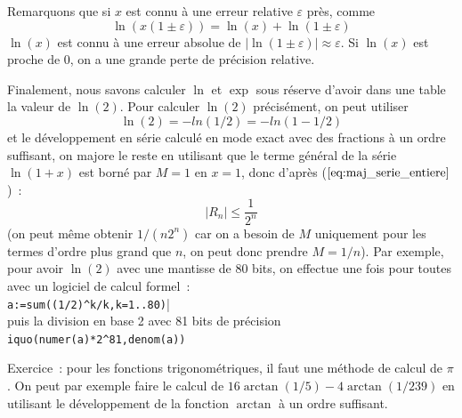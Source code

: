 \documentclass[a4paper,11pt]{article}
\begin{document}
\begin{giacjshere}
Remarquons que si $x$ est connu \`a une erreur relative $\varepsilon$
pr\`es, comme
\[ \ln(x(1 \pm \varepsilon))=\ln(x) + \ln(1 \pm \varepsilon) \]
$\ln(x)$ est connu \`a une erreur absolue de 
$|\ln(1 \pm \varepsilon)| \approx \varepsilon$. Si $\ln(x)$ est proche
de 0, on a une grande perte de pr\'ecision relative.

Finalement, nous savons calculer $\ln$ et $\exp$ sous r\'eserve
d'avoir dans une table la valeur de $\ln(2)$. Pour calculer
$\ln(2)$ pr\'ecis\'ement, on peut utiliser
\[ \ln(2)=-ln(1/2)=-ln(1-1/2) \]
et le d\'eveloppement en s\'erie calcul\'e en mode exact avec des
fractions \`a un ordre suffisant, on majore le reste en utilisant 
que le terme g\'en\'eral de la s\'erie $\ln(1+x)$ est born\'e par
$M=1$ en $x=1$, donc d'apr\`es (\(\ref{eq:maj_serie_entiere}\))~:
\[ |R_n| \leq \frac{1}{2^n}\]
(on peut m\^eme obtenir $1/(n2^n)$ car on a besoin de $M$ uniquement
pour les termes d'ordre plus grand que $n$, on peut donc prendre $M=1/n$).
Par exemple, pour avoir $\ln(2)$ avec une mantisse de 80 bits,
on effectue une fois pour toutes avec un logiciel
de calcul formel~:\\
\verb|a:=sum((1/2)^k/k,k=1..80)||\\
puis la division en base 2 avec 81 bits de pr\'ecision
\verb|iquo(numer(a)*2^81,denom(a))|

Exercice~: pour les fonctions trigonom\'etriques, il faut une
m\'ethode de calcul de $\pi$. On peut par exemple faire le calcul
de $16 \arctan(1/5)-4\arctan(1/239)$ en utilisant le d\'eveloppement
de la fonction $\arctan$ \`a un ordre suffisant.


\end{giacjshere}
\end{document}
